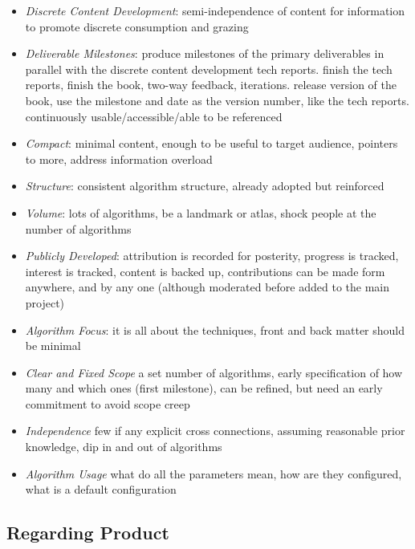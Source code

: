 \documentclass[a4paper, 11pt]{article}
\begin{document}
\begin{itemize}
	\item \emph{Discrete Content Development}: semi-independence of content for information to promote discrete consumption and grazing
	\item \emph{Deliverable Milestones}: produce milestones of the primary deliverables in parallel with the discrete content development tech reports. finish the tech reports, finish the book, two-way feedback, iterations. release version of the book, use the milestone and date as the version number, like the tech reports. continuously usable/accessible/able to be referenced 
	\item \emph{Compact}: minimal content, enough to be useful to target audience, pointers to more, address information overload 
	\item \emph{Structure}: consistent algorithm structure, already adopted but reinforced
	\item \emph{Volume}: lots of algorithms, be a landmark or atlas, shock people at the number of algorithms
	\item \emph{Publicly Developed}: attribution is recorded for posterity, progress is tracked, interest is tracked, content is backed up, contributions can be made form anywhere, and by any one (although moderated before added to the main project)
	\item \emph{Algorithm Focus}: it is all about the techniques, front and back matter should be minimal
	\item \emph{Clear and Fixed Scope} a set number of algorithms, early specification of how many and which ones (first milestone), can be refined, but need an early commitment to avoid scope creep
	\item \emph{Independence} few if any explicit cross connections, assuming reasonable prior knowledge, dip in and out of algorithms
	\item \emph{Algorithm Usage} what do all the parameters mean, how are they configured, what is a default configuration
\end{itemize}

\subsection{Regarding Product}
\end{document}
